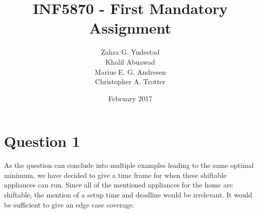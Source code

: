 \documentclass{article}
\title{INF5870 - First Mandatory Assignment}
\author{Zahra G. Yndestad \\ Khalil Abuawad \\ Marius E. G. Andresen \\ Christopher A. Trotter}
\date{February 2017}
\begin{document}

\section{Question 1}
	As the question can conclude into multiple examples leading to the same optimal minimum, we have decided to give a time frame for when these shiftable appliances can run. Since all of the mentioned appliances for the home are shiftable, the mention of a setup time and deadline would be irrelevant. It would be sufficient to give an edge case coverage.
\end{document}
